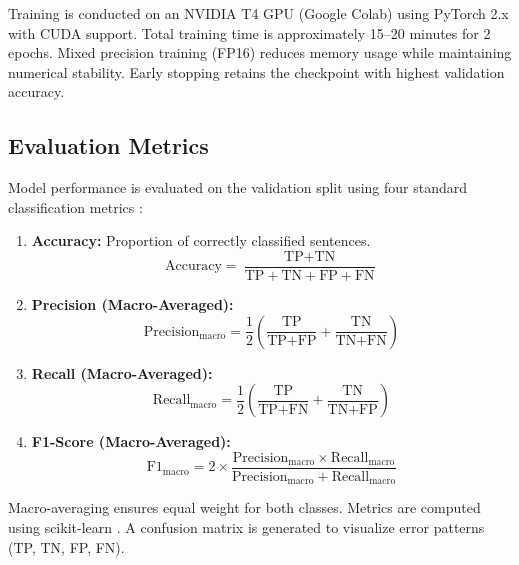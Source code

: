 \documentclass[pdflatex,sn-mathphys-num]{sn-jnl}
\theoremstyle{thmstyleone}%
\theoremstyle{thmstyletwo}%
\theoremstyle{thmstylethree}%
\begin{document}
Training is conducted on an NVIDIA T4 GPU (Google Colab) using PyTorch 2.x \cite{paszke2019pytorch} with CUDA support. Total training time is approximately 15–20 minutes for 2 epochs. Mixed precision training (FP16) reduces memory usage while maintaining numerical stability. Early stopping retains the checkpoint with highest validation accuracy.

\subsection{Evaluation Metrics}

Model performance is evaluated on the validation split using four standard classification metrics \cite{grandini2020metrics,miller2024review}:

\begin{enumerate}
    \item \textbf{Accuracy:} Proportion of correctly classified sentences.
    \begin{equation}
        \text{Accuracy} = \frac{\text{TP} + \text{TN}}{\text{TP} + \text{TN} + \text{FP} + \text{FN}}
    \end{equation}
    
    \item \textbf{Precision (Macro-Averaged):} 
    \begin{equation}
        \text{Precision}_{\text{macro}} = \frac{1}{2} \left( \frac{\text{TP}}{\text{TP} + \text{FP}} + \frac{\text{TN}}{\text{TN} + \text{FN}} \right)
    \end{equation}
    
    \item \textbf{Recall (Macro-Averaged):} 
    \begin{equation}
        \text{Recall}_{\text{macro}} = \frac{1}{2} \left( \frac{\text{TP}}{\text{TP} + \text{FN}} + \frac{\text{TN}}{\text{TN} + \text{FP}} \right)
    \end{equation}
    
    \item \textbf{F1-Score (Macro-Averaged):}
    \begin{equation}
        \text{F1}_{\text{macro}} = 2 \times \frac{\text{Precision}_{\text{macro}} \times \text{Recall}_{\text{macro}}}{\text{Precision}_{\text{macro}} + \text{Recall}_{\text{macro}}}
    \end{equation}
\end{enumerate}

Macro-averaging ensures equal weight for both classes. Metrics are computed using scikit-learn \cite{scikit-learn}. A confusion matrix is generated to visualize error patterns (TP, TN, FP, FN).
\end{document}
